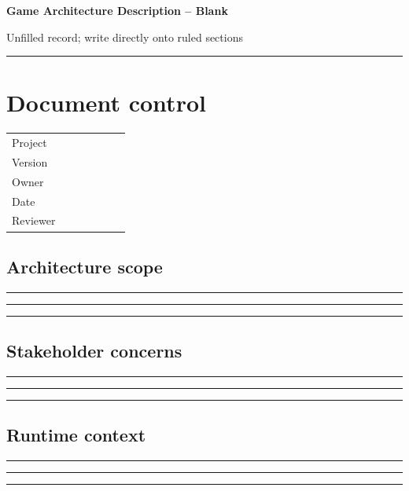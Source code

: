 \documentclass[11pt]{article}
\begin{document}
{\huge\bfseries\color{suiteblue} Game Architecture Description -- Blank}\par
\vspace{0.15in}
{\normalsize\color{suitegray} Unfilled record; write directly onto ruled sections}\par
\vspace{0.15in}\hrule\vspace{0.15in}

\section{Document control}
\renewcommand{\arraystretch}{1.8}
\begin{tabularx}{\linewidth}{@{}p{0.30\linewidth}X@{}}\toprule
Project & \hrulefill\\ Version & \hrulefill\\ Owner & \hrulefill\\ Date & \hrulefill\\ Reviewer & \hrulefill\\ \bottomrule\end{tabularx}

\subsection{Architecture scope}
\noindent\rule{\linewidth}{0.3pt}\par\vspace{0.18in}
\noindent\rule{\linewidth}{0.3pt}\par\vspace{0.18in}
\noindent\rule{\linewidth}{0.3pt}\par\vspace{0.14in}

\subsection{Stakeholder concerns}
\noindent\rule{\linewidth}{0.3pt}\par\vspace{0.18in}
\noindent\rule{\linewidth}{0.3pt}\par\vspace{0.18in}
\noindent\rule{\linewidth}{0.3pt}\par\vspace{0.14in}

\subsection{Runtime context}
\noindent\rule{\linewidth}{0.3pt}\par\vspace{0.18in}
\noindent\rule{\linewidth}{0.3pt}\par\vspace{0.18in}
\noindent\rule{\linewidth}{0.3pt}\par\vspace{0.14in}
\end{document}
